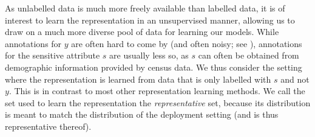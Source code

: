 As unlabelled data is much more freely available than labelled data, it is of interest to learn the
representation in an unsupervised manner, allowing us to draw on a much more diverse pool of data
for learning our models.
%
While annotations for $y$ are often hard to come by (and often noisy;
see \citealp{kehrenberg2020tuning}), annotations for the sensitive attribute $s$ are usually less so,
as $s$ can often be obtained from demographic information provided by census data. 
%
We thus consider the setting where the representation is learned from data that is only labelled
with $s$ and not $y$. 
%
This is in contrast to most other representation learning methods.
We call the set used to learn the representation the \emph{representative} set, because its
distribution is meant to match the distribution of the deployment setting (and is thus
representative thereof).

